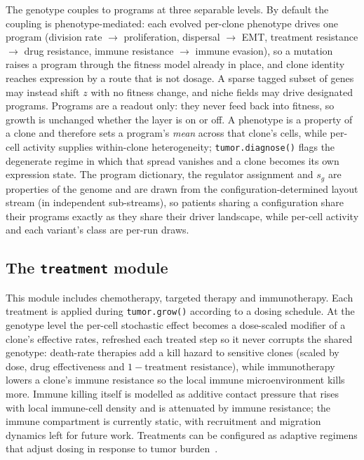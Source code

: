 \documentclass{article}
\begin{document}
The genotype couples to programs at three separable levels. By default the coupling is
phenotype-mediated: each evolved per-clone phenotype drives one program (division rate
$\rightarrow$ proliferation, dispersal $\rightarrow$ EMT, treatment resistance $\rightarrow$ drug
resistance, immune resistance $\rightarrow$ immune evasion), so a mutation raises a program through
the fitness model already in place, and clone identity reaches expression by a route that is not
dosage. A sparse tagged subset of genes may instead shift $z$ with no fitness change, and niche fields
may drive designated programs. Programs are a readout only: they never feed back into fitness, so
growth is unchanged whether the layer is on or off. A phenotype is a property of a clone and therefore
sets a program's \emph{mean} across that clone's cells, while per-cell activity supplies within-clone
heterogeneity; \texttt{tumor.diagnose()} flags the degenerate regime in which that spread vanishes and
a clone becomes its own expression state. The program dictionary, the regulator assignment and $s_g$
are properties of the genome and are drawn from the configuration-determined layout stream (in
independent sub-streams), so patients sharing a configuration share their programs exactly as they
share their driver landscape, while per-cell activity and each variant's class are per-run draws.

\subsection{The \texttt{treatment} module}
This module includes chemotherapy, targeted therapy and immunotherapy. Each treatment is applied
during \texttt{tumor.grow()} according to a dosing schedule. At the genotype level the per-cell
stochastic effect becomes a dose-scaled modifier of a clone's effective rates, refreshed each
treated step so it never corrupts the shared genotype: death-rate therapies add a kill hazard to
sensitive clones (scaled by dose, drug effectiveness and $1-\text{treatment resistance}$), while
immunotherapy lowers a clone's immune resistance so the local immune microenvironment kills more.
Immune killing itself is modelled as additive contact pressure that rises with local immune-cell
density and is attenuated by immune resistance; the immune compartment is currently static, with
recruitment and migration dynamics left for future work. Treatments can be configured as adaptive
regimens that adjust dosing in response to tumor burden~\cite{west_survey_2023}.
\end{document}
